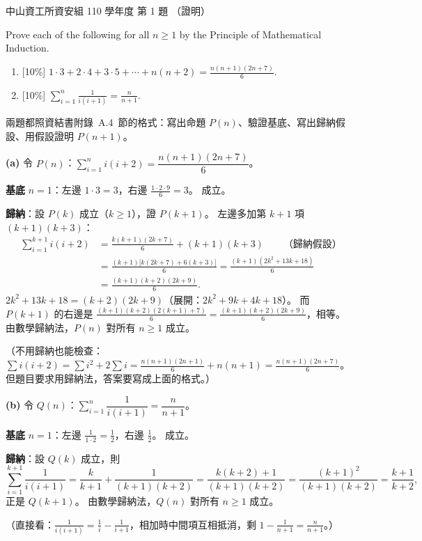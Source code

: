 \begin{pastexam}[label={px:nsysu-110-dmalg-01}]{中山資工所資安組 110 學年度 第 1 題}
（證明）

Prove each of the following for all $n\ge 1$ by the Principle of Mathematical Induction.
\begin{enumerate}[label=(\alph*)]
\item {[10\%]} $1\cdot 3+2\cdot 4+3\cdot 5+\cdots+n(n+2)=\frac{n(n+1)(2n+7)}{6}$.
\item {[10\%]} $\sum_{i=1}^{n}\frac{1}{i(i+1)}=\frac{n}{n+1}$.
\end{enumerate}
\end{pastexam}

\begin{pastsoln}
兩題都照資結書附錄~A.4~節的格式：寫出命題 $P(n)$、驗證基底、寫出歸納假設、用假設證明 $P(n+1)$。

\textbf{(a)} 令 $P(n)$：$\sum_{i=1}^{n} i(i+2) = \dfrac{n(n+1)(2n+7)}{6}$。

\textbf{基底} $n = 1$：左邊 $1 \cdot 3 = 3$，右邊 $\frac{1 \cdot 2 \cdot 9}{6} = 3$。 成立。

\textbf{歸納}：設 $P(k)$ 成立（$k \ge 1$），證 $P(k+1)$。 左邊多加第 $k + 1$ 項 $(k+1)(k+3)$：
\begin{align*}
\sum_{i=1}^{k+1} i(i+2) &= \frac{k(k+1)(2k+7)}{6} + (k+1)(k+3) \qquad \text{（歸納假設）}\\
&= \frac{(k+1)\bigl[k(2k+7) + 6(k+3)\bigr]}{6} = \frac{(k+1)(2k^2 + 13k + 18)}{6}\\
&= \frac{(k+1)(k+2)(2k+9)}{6}.
\end{align*}
$2k^2 + 13k + 18 = (k+2)(2k+9)$（展開：$2k^2 + 9k + 4k + 18$）。 而 $P(k+1)$ 的右邊是
$\frac{(k+1)(k+2)(2(k+1)+7)}{6} = \frac{(k+1)(k+2)(2k+9)}{6}$，相等。 由數學歸納法，$P(n)$ 對所有 $n \ge 1$ 成立。

（不用歸納也能檢查：$\sum i(i+2) = \sum i^2 + 2\sum i = \frac{n(n+1)(2n+1)}{6} + n(n+1) = \frac{n(n+1)(2n+7)}{6}$。
但題目要求用歸納法，答案要寫成上面的格式。）

\textbf{(b)} 令 $Q(n)$：$\sum_{i=1}^{n} \dfrac{1}{i(i+1)} = \dfrac{n}{n+1}$。

\textbf{基底} $n = 1$：左邊 $\frac{1}{1 \cdot 2} = \frac12$，右邊 $\frac{1}{2}$。 成立。

\textbf{歸納}：設 $Q(k)$ 成立，則
\[
\sum_{i=1}^{k+1} \frac{1}{i(i+1)} = \frac{k}{k+1} + \frac{1}{(k+1)(k+2)} = \frac{k(k+2) + 1}{(k+1)(k+2)}
= \frac{(k+1)^2}{(k+1)(k+2)} = \frac{k+1}{k+2},
\]
正是 $Q(k+1)$。 由數學歸納法，$Q(n)$ 對所有 $n \ge 1$ 成立。

（直接看：$\frac{1}{i(i+1)} = \frac{1}{i} - \frac{1}{i+1}$，相加時中間項互相抵消，剩 $1 - \frac{1}{n+1} = \frac{n}{n+1}$。）
\end{pastsoln}
